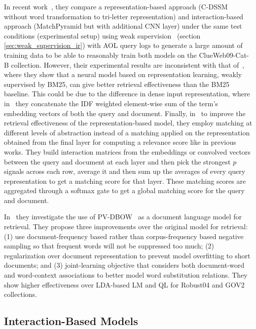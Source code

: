 In recent work~\citep{Nie_ictir18}, they compare a representation-based approach (C-DSSM without word transformation to tri-letter representation) and interaction-based approach (MatchPyramid but with additional CNN layer) under the same test conditions (experimental setup) using weak supervision~\citep{Dehghani_sigir17} (section \ref{sec:weak_supervision_ir}) with AOL query logs to generate a large amount of training data to be able to reasonably train both models on the ClueWeb09-Cat-B collection. However, their experimental results are inconsistent with that of~\cite{Dehghani_sigir17}, where they show that a neural model based on representation learning, weakly supervised by BM25, can give better retrieval effectiveness than the BM25 baseline. This could be due to the difference in dense input representation, where in~\cite{Dehghani_sigir17} they concatenate the IDF weighted element-wise sum of the term's embedding vectors of both the query and document. Finally, in~\cite{Nie_ictir18} to improve the retrieval effectiveness of the representation-based model, they employ matching at different levels of abstraction instead of a matching applied on the representation obtained from the final layer for computing a relevance score like in previous works. They build interaction matrices from the embeddings or convolved vectors between the query and document at each layer and then pick the strongest $p$ signals across each row, average it and then sum up the averages of every query representation to get a matching score for that layer. These matching scores are aggregated through a softmax gate to get a global matching score for the query and document.

In~\cite{Ai2016a,Ai2016b} they investigate the use of \textsf{PV-DBOW}~\citep{Le2014} as a document language model for retrieval. They propose three improvements over the original model for retrieval: (1) use document-frequency based rather than corpus-frequency based negative sampling so that frequent words will not be suppressed too much; (2) regularization over document representation to prevent model overfitting to short documents; and (3) joint-learning objective that considers both document-word and word-context associations to better model word substitution relations. They show higher effectiveness over LDA-based LM and QL for Robust04 and GOV2 collections.

\subsection{Interaction-Based Models}
\label{sec:interaction_based}


